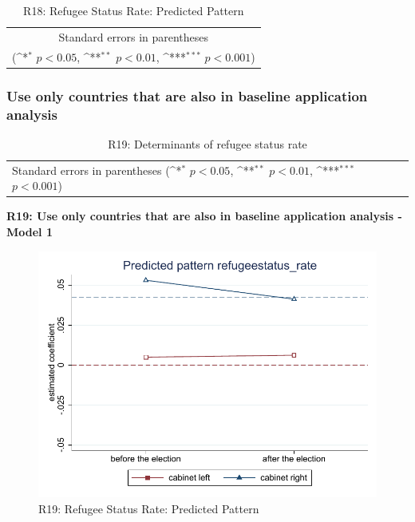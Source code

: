 \documentclass[10pt,a4paper]{scrartcl}
\begin{document}
\begin{table}[!ht]\centering
	\footnotesize
	\renewcommand{\arraystretch}{1.2}
	\def\sym#1{\ifmmode^{#1}\else\(^{#1}\)\fi}
	\caption{R18: Refugee Status Rate: Predicted Pattern}
	\begin{tabular}{l*{2}{c}}
		\hline\hline
		
		\hline\hline
		\multicolumn{3}{c}{\footnotesize Standard errors in parentheses} \\
		\multicolumn{3}{c}{\footnotesize (\sym{*} \(p<0.05\), \sym{**} \(p<0.01\), \sym{***} \(p<0.001\))} \\
	\end{tabular}
\end{table}





\clearpage
\FloatBarrier
\subsubsection{Use only countries that are also in baseline application analysis}
\begin{table}[!ht]\centering
	\renewcommand{\arraystretch}{1.25}
	\small
	\def\sym#1{\ifmmode^{#1}\else\(^{#1}\)\fi}
	\caption{R19: Determinants of refugee status rate}
	\begin{tabular}{l*{3}{c}}
		\hline\hline
		
		\hline\hline
		\multicolumn{4}{l}{\footnotesize Standard errors in parentheses (\sym{*} \(p<0.05\), \sym{**} \(p<0.01\), \sym{***} \(p<0.001\))}\\
	\end{tabular}
\end{table}

\clearpage
\textbf{R19: Use only countries that are also in baseline application analysis - Model 1}
\begin{figure}[!ht]
	\centering
	\includegraphics[width=1\textwidth]{figures_edited/refugeestatus_rate_graph1_R19.pdf}
	\caption{R19: Refugee Status Rate: Predicted Pattern}
\end{figure}
\end{document}
